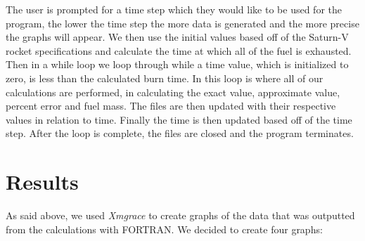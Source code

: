 \documentclass[11pt]{article}
\begin{document}
The user is prompted for a time step which they would like to be used for the program, the lower the time step the more data is generated and the more precise the graphs will appear. We then use the initial values based off of the Saturn-V rocket specifications and calculate the time at which all of the fuel is exhausted. Then in a while loop we loop through while a time value, which is initialized to zero, is less than the calculated burn time. In this loop is where all of our calculations are performed, in calculating the exact value, approximate value, percent error and fuel mass. The files are then updated with their respective values in relation to time. Finally the time is then updated based off of the time step. After the loop is complete, the files are closed and the program terminates.

\section{Results}
As said above, we used \textit{Xmgrace} to create graphs of the data that was outputted from the calculations with FORTRAN. We decided to create four graphs:

\vspace{0.25cm}
\end{document}
